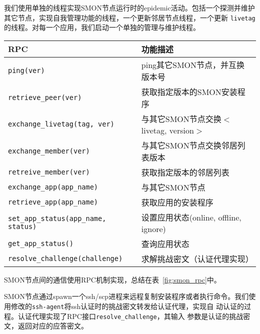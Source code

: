 我们使用单独的线程实现SMON节点运行时的epidemic活动。包括一个探测并维护
其它节点，实现自我管理功能的线程，一个更新邻居节点线程，一个更新
\texttt{livetag}的线程。对每一个应用，我们启动一个单独的管理与维护线程。

\begin{table*}
\small
\centering
\caption{SMON节点与认证代理支持的RPC调用语意}
\label{fig:smon_rpc}
\begin{tabular}{lp{7cm}}

\toprule[1.5pt]
\textbf{RPC} & \textbf{功能描述} \\

\midrule[1pt]
\texttt{ping(ver)} & ping其它SMON节点，并互换版本号\\

\texttt{retrieve\_peer(ver)} & 获取指定版本的SMON安装程序\\

\texttt{exchange\_livetag(tag, ver)} & 与其它SMON节点交换$<$livetag,
version$>$\\

\texttt{exchange\_member(ver)} & 与其它SMON节点交换邻居列表版本\\

\texttt{retreive\_member(ver)} & 获取指定版本的邻居列表\\

\texttt{exchange\_app(app\_name)} & 与其它SMON节点\\

\texttt{retrieve\_app(app\_name)} & 获取应用的安装程序\\

\texttt{set\_app\_status(app\_name, status)} & 设置应用状态(online,
offline, ignore)\\

\texttt{get\_app\_status()} & 查询应用状态\\

\texttt{resolve\_challenge(challenge)} & 求解挑战密文（认证代理实现）\\

\bottomrule[1.5pt]
\end{tabular}
\end{table*}


SMON节点间的通信使用RPC机制实现，总结在表~\ref{fig:smon_rpc}中。

SMON节点通过spawn一个ssh/scp进程来远程复制安装程序或者执行命令。我们使
用修改的\texttt{ssh-agent}将ssh认证时的挑战密文转发给认证代理，实现自
动认证的过程。认证代理实现了RPC接口\texttt{resolve\_challenge}，其输入
参数是认证的挑战密文，返回对应的应答密文。

